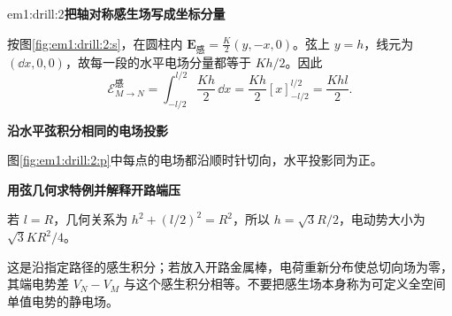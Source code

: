 \begin{drillsolution}{em1:drill:2}\textbf{把轴对称感生场写成坐标分量}\par\nobreak
按图\ref{fig:em1:drill:2:s}，在圆柱内 $\bm E_{\text{感}}=\tfrac K2(y,-x,0)$。弦上 $y=h$，线元为 $(\dd x,0,0)$，故每一段的水平电场分量都等于 $Kh/2$。因此
\[\mathcal E_{M\to N}^{\text{感}}=\int_{-l/2}^{l/2}\frac{Kh}{2}\,\dd x
=\frac{Kh}{2}[x]_{-l/2}^{l/2}=\frac{Khl}{2}.\]



\par\medskip{}\noindent\textbf{沿水平弦积分相同的电场投影}\par\nobreak
图\ref{fig:em1:drill:2:p}中每点的电场都沿顺时针切向，水平投影同为正。



\par\medskip{}\noindent\textbf{用弦几何求特例并解释开路端压}\par\nobreak
若 $l=R$，几何关系为 $h^2+(l/2)^2=R^2$，所以 $h=\sqrt3R/2$，电动势大小为 $\sqrt3KR^2/4$。

这是沿指定路径的感生积分；若放入开路金属棒，电荷重新分布使总切向场为零，其端电势差 $V_N-V_M$ 与这个感生积分相等。不要把感生场本身称为可定义全空间单值电势的静电场。\end{drillsolution}

